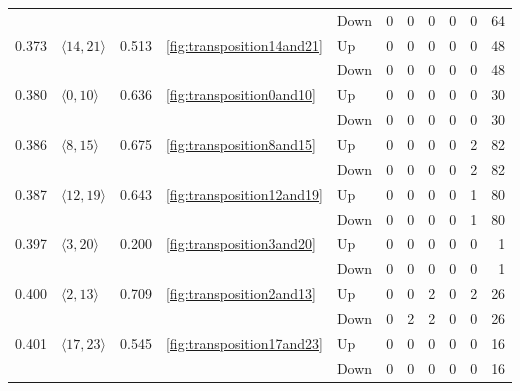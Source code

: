 \documentclass{article}
\begin{document}
\begin{center}
\begin{tabular}{lllllrrrrrr}
 &  &  &  & Down & 0 & 0 & 0 & 0 & 0 & 64 \\
\cline{1-11} \cline{2-11} \cline{3-11} \cline{4-11}
\multirow[t]{2}{*}{0.373} & \multirow[t]{2}{*}{$\langle14, 21\rangle$} & \multirow[t]{2}{*}{0.513} & \multirow[t]{2}{*}{\ref{fig:transposition14and21}} & Up & 0 & 0 & 0 & 0 & 0 & 48 \\
 &  &  &  & Down & 0 & 0 & 0 & 0 & 0 & 48 \\
\cline{1-11} \cline{2-11} \cline{3-11} \cline{4-11}
\multirow[t]{2}{*}{0.380} & \multirow[t]{2}{*}{$\langle0, 10\rangle$} & \multirow[t]{2}{*}{0.636} & \multirow[t]{2}{*}{\ref{fig:transposition0and10}} & Up & 0 & 0 & 0 & 0 & 0 & 30 \\
 &  &  &  & Down & 0 & 0 & 0 & 0 & 0 & 30 \\
\cline{1-11} \cline{2-11} \cline{3-11} \cline{4-11}
\multirow[t]{2}{*}{0.386} & \multirow[t]{2}{*}{$\langle8, 15\rangle$} & \multirow[t]{2}{*}{0.675} & \multirow[t]{2}{*}{\ref{fig:transposition8and15}} & Up & 0 & 0 & 0 & 0 & 2 & 82 \\
 &  &  &  & Down & 0 & 0 & 0 & 0 & 2 & 82 \\
\cline{1-11} \cline{2-11} \cline{3-11} \cline{4-11}
\multirow[t]{2}{*}{0.387} & \multirow[t]{2}{*}{$\langle12, 19\rangle$} & \multirow[t]{2}{*}{0.643} & \multirow[t]{2}{*}{\ref{fig:transposition12and19}} & Up & 0 & 0 & 0 & 0 & 1 & 80 \\
 &  &  &  & Down & 0 & 0 & 0 & 0 & 1 & 80 \\
\cline{1-11} \cline{2-11} \cline{3-11} \cline{4-11}
\multirow[t]{2}{*}{0.397} & \multirow[t]{2}{*}{$\langle3, 20\rangle$} & \multirow[t]{2}{*}{0.200} & \multirow[t]{2}{*}{\ref{fig:transposition3and20}} & Up & 0 & 0 & 0 & 0 & 0 & 1 \\
 &  &  &  & Down & 0 & 0 & 0 & 0 & 0 & 1 \\
\cline{1-11} \cline{2-11} \cline{3-11} \cline{4-11}
\multirow[t]{2}{*}{0.400} & \multirow[t]{2}{*}{$\langle2, 13\rangle$} & \multirow[t]{2}{*}{0.709} & \multirow[t]{2}{*}{\ref{fig:transposition2and13}} & Up & 0 & 0 & 2 & 0 & 2 & 26 \\
 &  &  &  & Down & 0 & 2 & 2 & 0 & 0 & 26 \\
\cline{1-11} \cline{2-11} \cline{3-11} \cline{4-11}
\multirow[t]{2}{*}{0.401} & \multirow[t]{2}{*}{$\langle17, 23\rangle$} & \multirow[t]{2}{*}{0.545} & \multirow[t]{2}{*}{\ref{fig:transposition17and23}} & Up & 0 & 0 & 0 & 0 & 0 & 16 \\
 &  &  &  & Down & 0 & 0 & 0 & 0 & 0 & 16 \\

\end{tabular}
\end{center}
\end{document}
